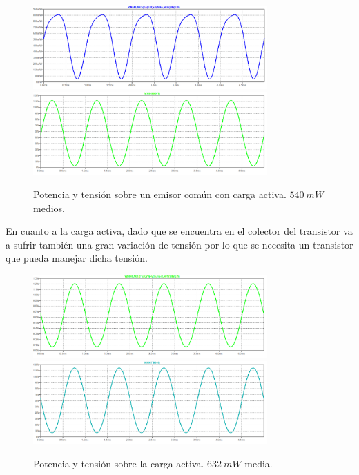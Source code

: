 \begin{figure}[H]
	\centering
	\includegraphics[width=0.8\textwidth]{ImagenesSimulaciones/PECF.png}
		\includegraphics[width=0.8\textwidth]{ImagenesSimulaciones/VECF.png}
	\caption{Potencia y tensión sobre un emisor común con carga activa. $540 \ mW$ medios.}
	\label{fig:pecf}
\end{figure}
En cuanto a la carga activa, dado que se encuentra en el colector del transistor va a  sufrir también una gran variación de tensión por lo que se necesita un transistor que pueda manejar dicha tensión.
\begin{figure}[H]
	\centering
	\includegraphics[width=0.8\textwidth]{ImagenesSimulaciones/PCSEC.png}
		\includegraphics[width=0.8\textwidth]{ImagenesSimulaciones/VCSEC.png}
	\caption{Potencia y tensión sobre la carga activa. $632 \ mW$ media.}
	\label{fig:pcsecf}
\end{figure}

